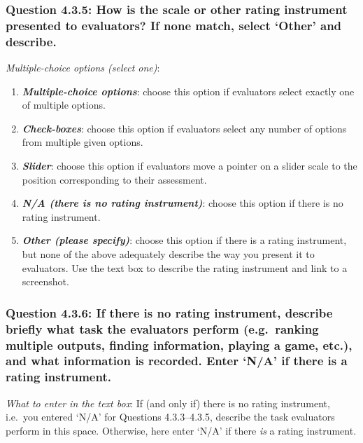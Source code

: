 \documentclass[11pt,a4paper]{article}
\newcommand{\egcvalue}[1]{\textbf{\textit{#1}}}
\begin{document}
\subsubsection*{Question 4.3.5:  How is the scale or other rating instrument presented to evaluators? If none match, select `Other’ and describe.}

\noindent\textit{Multiple-choice options (select one)}:  
\vspace{-.1cm}

\begin{enumerate}[itemsep=0cm,leftmargin=0.5cm,label={\LARGE $\circ$}]
    \item \egcvalue{Multiple-choice options}: choose this option if evaluators select exactly one of multiple options.
    \item \egcvalue{Check-boxes}: choose this option if evaluators select any number of options from multiple given options.
    \item \egcvalue{Slider}: choose this option if evaluators move a pointer on a slider scale to the position corresponding to their assessment.
    \item \egcvalue{N/A (there is no rating instrument)}: choose this option if there is no rating instrument.
    \item \egcvalue{Other (please specify)}: choose this option if there is a rating instrument, but none of the above adequately describe the way you present it to evaluators. Use the text box to describe the rating instrument and link to a screenshot.
\end{enumerate}

\subsubsection*{Question 4.3.6:  If there is no rating instrument, describe briefly what task the evaluators perform (e.g.\ ranking multiple outputs, finding information, playing a game, etc.), and what information is recorded. Enter `N/A' if there is a rating instrument.}

\noindent\textit{What to enter in the text box}:  If (and only if) there is no rating instrument, i.e.\ you entered `N/A' for Questions 4.3.3--4.3.5, describe the task evaluators perform in this space. Otherwise, here enter `N/A' if there \textit{is} a rating instrument.
\end{document}

